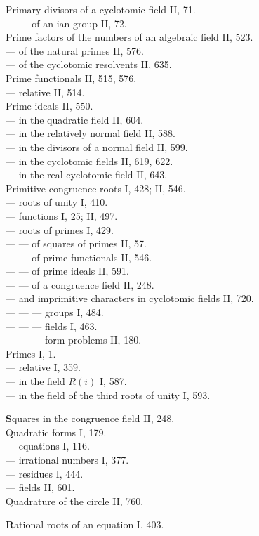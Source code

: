 Primary divisors of a cyclotomic field II, 71.\\
--- --- of an ian group II, 72.\\
Prime factors of the numbers of an algebraic field II, 523.\\
--- of the natural primes II, 576.\\
--- of the cyclotomic resolvents II, 635.\\
Prime functionals II, 515, 576.\\
--- relative II, 514.\\
Prime ideals II, 550.\\
--- in the quadratic field II, 604.\\
--- in the relatively normal field II, 588.\\
--- in the divisors of a normal field II, 599.\\
--- in the cyclotomic fields II, 619, 622.\\
--- in the real cyclotomic field II, 643.\\
Primitive congruence roots I, 428; II, 546.\\
--- roots of unity I, 410.\\
--- functions I, 25; II, 497.\\
--- roots of primes I, 429.\\
--- --- of squares of primes II, 57.\\
--- --- of prime functionals II, 546.\\
--- --- of prime ideals II, 591.\\
--- --- of a congruence field II, 248.\\
--- and imprimitive characters in cyclotomic fields II, 720.\\
--- --- --- groups I, 484.\\
--- --- --- fields I, 463.\\
--- --- --- form problems II, 180.\\
Primes I, 1.\\
--- relative I, 359.\\
--- in the field $R(i)$ I, 587.\\
--- in the field of the third roots of unity I, 593.

\medskip
\noindent
\textbf{S}quares in the congruence field II, 248.\\
Quadratic forms I, 179.\\
--- equations I, 116.\\
--- irrational numbers I, 377.\\
--- residues I, 444.\\
--- fields II, 601.\\
Quadrature of the circle II, 760.

\medskip
\noindent
\textbf{R}ational roots of an equation I, 403.
